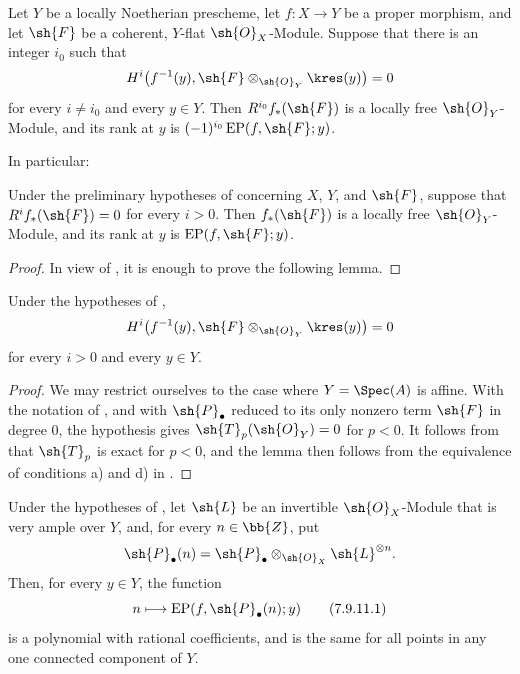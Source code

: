 \begin{corollary}[7.9.9]
\label{III.7.9.9}
Let $Y$ be a locally Noetherian prescheme, let
$f:X\to Y$ be a proper morphism, and let $\sh{F}$ be a
coherent, $Y$-flat $\sh{O}_X$-Module.  Suppose that there
is an integer $i_0$ such that
\[
  H^i\bigl(f^{-1}(y),
    \sh{F}\otimes_{\sh{O}_Y}\kres(y)\bigr)=0
\]
for every $i\neq i_0$ and every $y\in Y$.  Then
$R^{i_0}f_*(\sh{F})$ is a locally free
$\sh{O}_Y$-Module, and its rank at $y$ is
$(-1)^{i_0}\operatorname{EP}(f,\sh{F};y)$.
\end{corollary}

In particular:

\begin{corollary}[7.9.10]
\label{III.7.9.10}
Under the preliminary hypotheses of 
concerning $X$, $Y$, and $\sh{F}$, suppose that
$R^if_*(\sh{F})=0$ for every $i>0$.  Then
$f_*(\sh{F})$ is a locally free $\sh{O}_Y$-Module, and its
rank at $y$ is $\operatorname{EP}(f,\sh{F};y)$.
\end{corollary}

\begin{proof}
In view of , it is enough to prove the
following lemma.
\end{proof}

\begin{lemma}[7.9.10.1]
\label{III.7.9.10.1}
Under the hypotheses of ,
\[
  H^i\bigl(f^{-1}(y),
    \sh{F}\otimes_{\sh{O}_Y}\kres(y)\bigr)=0
\]
for every $i>0$ and every $y\in Y$.
\end{lemma}

\begin{proof}
We may restrict ourselves to the case where
$Y=\Spec(A)$ is affine.  With the notation of
, and with $\sh{P}_\bullet$ reduced to its
only nonzero term $\sh{F}$ in degree $0$, the hypothesis
gives $\sh{T}_p(\sh{O}_Y)=0$ for $p<0$.  It follows from
 that $\sh{T}_p$ is exact for $p<0$, and
the lemma then follows from the equivalence of conditions
a) and d) in .
\end{proof}

\begin{proposition}[7.9.11]
\label{III.7.9.11}
Under the hypotheses of , let $\sh{L}$ be
an invertible $\sh{O}_X$-Module that is very ample over
$Y$, and, for every $n\in\bb{Z}$, put
\[
  \sh{P}_\bullet(n)
  =
  \sh{P}_\bullet
    \otimes_{\sh{O}_X}\sh{L}^{\otimes n}.
\]
Then, for every $y\in Y$, the function
\[
  n\longmapsto
  \operatorname{EP}(f,\sh{P}_\bullet(n);y)
  \tag{7.9.11.1}\label{III.7.9.11.1}
\]
is a polynomial with rational coefficients, and is the
same for all points in any one connected component of
$Y$.
\end{proposition}

